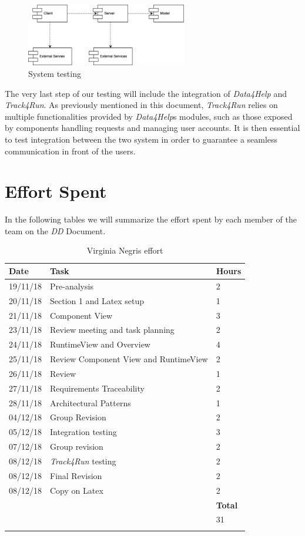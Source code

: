 \documentclass[titlepage]{article}
\begin{document}
	\begin{figure}[H]
		\center
		\includegraphics[width=7cm]{SystemTesting.png}
		\caption{System testing}
		\label{fig:SystemTesting}
	\end{figure}
	\noindent
	The very last step of our testing will include the integration of {\it Data4Help} and {\it Track4Run}. As previously mentioned in this document, {\it Track4Run} relies on multiple functionalities provided by {\it Data4Help}\textsc{}s modules, such as those exposed by components handling requests and managing user accounts. It is then essential to test integration between the two system in order to guarantee a seamless communication in front of the users.  
	\pagebreak
	
	
	\section{Effort Spent}
	
	In the following tables we will summarize the effort spent by each member of the team on the {\it DD} Document.
	
	
	\begin{longtable}{| p{2 cm} | p{5 cm} | p{2 cm} |} 
		\hline
		{\bf Date} & {\bf Task} & {\bf Hours}\\
		\hline
		19/11/18 & Pre-analysis & 2 \\
		20/11/18 & Section 1 and Latex setup & 1\\
		21/11/18 & Component View & 3 \\
		23/11/18 & Review meeting and task planning & 2 \\
		24/11/18 & RuntimeView and Overview & 4 \\
		25/11/18 & Review Component View and RuntimeView & 2 \\
		26/11/18 & Review & 1 \\
		27/11/18 & Requirements Traceability & 2 \\
		28/11/18 & Architectural Patterns & 1 \\
		04/12/18 & Group Revision & 2\\
		05/12/18 & Integration testing & 3 \\
		07/12/18 & Group revision & 2 \\
		08/12/18 & {\it Track4Run} testing & 2 \\
		08/12/18 & Final Revision & 2 \\
		08/12/18 & Copy on Latex & 2 \\
		\hline
		& & {\bf Total} \\
		\hline
		& & 31 \\
		\hline
		\caption{Virginia Negri\textsc{\char13}s effort}
	\end{longtable}
	
\end{document}
